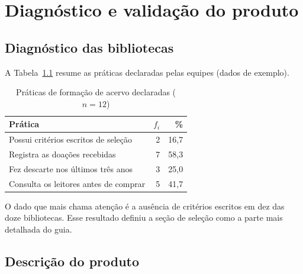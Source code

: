 \chapter{Diagnóstico e validação do produto}
\label{cap:diagnostico}


\section{Diagnóstico das bibliotecas}
A Tabela~\ref{tab:praticas} resume as práticas declaradas pelas equipes (dados de exemplo).

\begin{table}[htb]
  \centering
  \caption{Práticas de formação de acervo declaradas ($n = 12$)}
  \label{tab:praticas}
  \begin{tabular}{lrr}
    \toprule
    \textbf{Prática} & \textbf{$f_i$} & \textbf{\%} \\
    \midrule
    Possui critérios escritos de seleção & 2 & 16,7 \\
    Registra as doações recebidas & 7 & 58,3 \\
    Fez descarte nos últimos três anos & 3 & 25,0 \\
    Consulta os leitores antes de comprar & 5 & 41,7 \\
    \bottomrule
  \end{tabular}
\end{table}

O dado que mais chama atenção é a ausência de critérios escritos em dez das doze bibliotecas. Esse resultado definiu a seção de seleção como a parte mais detalhada do guia.

\section{Descrição do produto}

